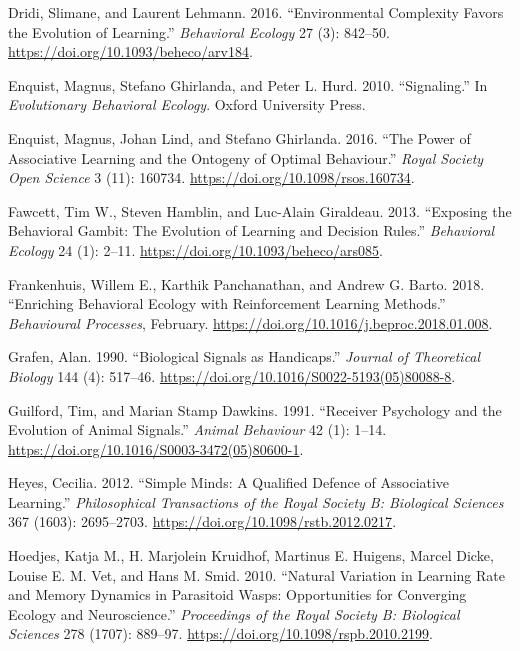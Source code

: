 \documentclass[
  12pt,
]{article}
\newlength{\cslhangindent}
\newlength{\cslentryspacingunit} %
\newenvironment{CSLReferences}[2] %
 {%
  \setlength{\parindent}{0pt}
  \ifodd #1
  \let\oldpar\par
  \def\par{\hangindent=\cslhangindent\oldpar}
  \fi
  \setlength{\parskip}{#2\cslentryspacingunit}
 }%
 {}
\begin{document}
\begin{CSLReferences}{1}{0}
\leavevmode{}%
Dridi, Slimane, and Laurent Lehmann. 2016. {``Environmental Complexity
Favors the Evolution of Learning.''} \emph{Behavioral Ecology} 27 (3):
842--50. \url{https://doi.org/10.1093/beheco/arv184}.

\leavevmode{}%
Enquist, Magnus, Stefano Ghirlanda, and Peter L. Hurd. 2010.
{``Signaling.''} In \emph{Evolutionary {Behavioral} {Ecology}}. Oxford
University Press.

\leavevmode{}%
Enquist, Magnus, Johan Lind, and Stefano Ghirlanda. 2016. {``The Power
of Associative Learning and the Ontogeny of Optimal Behaviour.''}
\emph{Royal Society Open Science} 3 (11): 160734.
\url{https://doi.org/10.1098/rsos.160734}.

\leavevmode{}%
Fawcett, Tim W., Steven Hamblin, and Luc-Alain Giraldeau. 2013.
{``Exposing the Behavioral Gambit: The Evolution of Learning and
Decision Rules.''} \emph{Behavioral Ecology} 24 (1): 2--11.
\url{https://doi.org/10.1093/beheco/ars085}.

\leavevmode{}%
Frankenhuis, Willem E., Karthik Panchanathan, and Andrew G. Barto. 2018.
{``Enriching Behavioral Ecology with Reinforcement Learning Methods.''}
\emph{Behavioural Processes}, February.
\url{https://doi.org/10.1016/j.beproc.2018.01.008}.

\leavevmode{}%
Grafen, Alan. 1990. {``Biological Signals as Handicaps.''} \emph{Journal
of Theoretical Biology} 144 (4): 517--46.
\url{https://doi.org/10.1016/S0022-5193(05)80088-8}.

\leavevmode{}%
Guilford, Tim, and Marian Stamp Dawkins. 1991. {``Receiver Psychology
and the Evolution of Animal Signals.''} \emph{Animal Behaviour} 42 (1):
1--14. \url{https://doi.org/10.1016/S0003-3472(05)80600-1}.

\leavevmode{}%
Heyes, Cecilia. 2012. {``Simple Minds: A Qualified Defence of
Associative Learning.''} \emph{Philosophical Transactions of the Royal
Society B: Biological Sciences} 367 (1603): 2695--2703.
\url{https://doi.org/10.1098/rstb.2012.0217}.

\leavevmode{}%
Hoedjes, Katja M., H. Marjolein Kruidhof, Martinus E. Huigens, Marcel
Dicke, Louise E. M. Vet, and Hans M. Smid. 2010. {``Natural Variation in
Learning Rate and Memory Dynamics in Parasitoid Wasps: Opportunities for
Converging Ecology and Neuroscience.''} \emph{Proceedings of the Royal
Society B: Biological Sciences} 278 (1707): 889--97.
\url{https://doi.org/10.1098/rspb.2010.2199}.


\end{CSLReferences}
\end{document}
